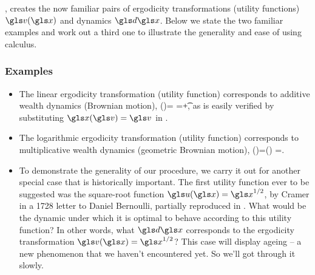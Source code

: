 , creates the now familiar pairs of ergodicity transformations (utility functions) $\gv(\x)$ and dynamics
$\gd\x$. Below we state the two familiar examples and work out a third one to illustrate the generality and
ease of using \Ito calculus.

\subsubsection{Examples}
\begin{itemize}
\item
The linear ergodicity transformation (utility function) corresponds to additive wealth dynamics (Brownian motion),
\be
\gv(\x)=\x \hspace{.4cm} \leftrightarrow \hspace{.4cm} \gd\x=\av \gd\t +\bv \gd\gW,\hspace{1.3cm}
\ee
as is easily verified by substituting $\x(\gv)=\gv$ in .
\item
The logarithmic ergodicity transformation (utility function) corresponds to multiplicative wealth dynamics (geometric Brownian motion),
\be
\gv(\x)=\ln(\x) \hspace{.4cm} \leftrightarrow \hspace{.4cm} \gd\x=\x{}.
\ee
\item
To demonstrate the generality of our procedure, we carry it out for another 
special case that is historically important. The first utility function ever to be 
suggested was the square-root 
function $\gu(\x)=\x^{1/2}$, by Cramer in a 1728 letter to Daniel Bernoulli, 
partially reproduced in \cite{Bernoulli1738}. What would be the dynamic 
under which it is optimal to behave according to this utility function? In 
other words, what $\gd\x$ corresponds to the ergodicity transformation $\gv(\x)=\x^{1/2}$?
This case will display ageing -- a new phenomenon that we haven't encountered yet. So we'll got through it slowly.


\end{itemize}

